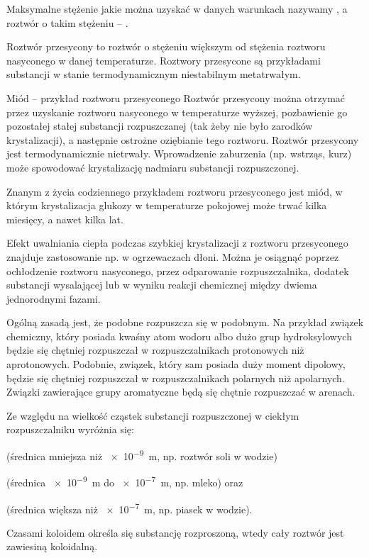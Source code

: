 Maksymalne stężenie jakie można uzyskać w danych warunkach nazywamy , a roztwór o takim stężeniu -- .

{\color{red}
Roztwór przesycony to roztwór o stężeniu większym od stężenia roztworu nasyconego w danej temperaturze. Roztwory przesycone są przykładami substancji w stanie termodynamicznym niestabilnym metatrwałym.


Miód – przykład roztworu przesyconego
Roztwór przesycony można otrzymać przez uzyskanie roztworu nasyconego w temperaturze wyższej, pozbawienie go pozostałej stałej substancji rozpuszczanej (tak żeby nie było zarodków krystalizacji), a następnie ostrożne oziębianie tego roztworu. Roztwór przesycony jest termodynamicznie nietrwały. Wprowadzenie zaburzenia (np. wstrząs, kurz) może spowodować krystalizację nadmiaru substancji rozpuszczonej.

Znanym z życia codziennego przykładem roztworu przesyconego jest miód, w którym krystalizacja glukozy w temperaturze pokojowej może trwać kilka miesięcy, a nawet kilka lat.

Efekt uwalniania ciepła podczas szybkiej krystalizacji z roztworu przesyconego znajduje zastosowanie np. w ogrzewaczach dłoni.
Można je osiągnąć poprzez ochłodzenie roztworu nasyconego, przez odparowanie rozpuszczalnika, dodatek substancji wysalającej lub w wyniku reakcji chemicznej między dwiema jednorodnymi fazami.}

{\color{red}
Ogólną zasadą jest, że podobne rozpuszcza się w podobnym. Na przykład związek chemiczny, który posiada kwaśny atom wodoru albo dużo grup hydroksylowych będzie się chętniej rozpuszczał w rozpuszczalnikach protonowych niż aprotonowych. Podobnie, związek, który sam posiada duży moment dipolowy, będzie się chętniej rozpuszczał w rozpuszczalnikach polarnych niż apolarnych. Związki zawierające grupy aromatyczne będą się chętnie rozpuszczać w arenach.
}

Ze względu na wielkość cząstek substancji rozpuszczonej w ciekłym rozpuszczalniku wyróżnia się:
\begin{compactitem}
\item {} (średnica mniejsza niż \SI{e-9}{\metre}, np. roztwór soli w wodzie)
\item {} (średnica \SI{e-9}{\metre} do \SI{e-7}{\metre}, np. mleko) oraz 
\item {} (średnica większa niż \SI{e-7}{\metre}, np. piasek w wodzie).
\end{compactitem}
%
%
%
Czasami koloidem określa się substancję rozproszoną, wtedy cały roztwór jest zawiesiną koloidalną. %

